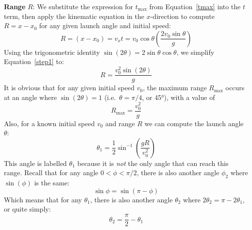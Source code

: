 \documentclass{../../../oss-handout}
\begin{document}
\textbf{Range} $R$: We substitute the expression for $t_\text{max}$ from
Equation~\ref{tmax} into the $t$ term, then apply the kinematic equation in
the $x$-direction to compute $R=x-x_0$ for any given launch angle and initial
speed:
\begin{equation}
  R=(x-x_0)=v_xt=v_0\cos\theta\left(\frac{2v_0\sin\theta}{g}\right)
  \label{step1}
\end{equation}
Using the trigonometric identity $\sin(2\theta)=2\sin\theta\cos\theta$, we
simplify Equation~\ref{step1} to:
\begin{equation}
  \boxed{R=\frac{v_0^2\sin(2\theta)}g}
\end{equation}
It is obvious that for any given initial speed $v_0$, the maximum range
$R_\text{max}$ occurs at an angle where $\sin(2\theta)=1$
(i.e.\ $\theta=\pi/4$, or \ang{45}), with a value of
\begin{equation}
  \boxed{R_\text{max}=\frac{v_0^2}g}
\end{equation}
Also, for a known initial speed $v_0$ and range $R$ we can compute the launch
angle $\theta$:
\begin{displaymath}
  \theta_1=\frac{1}{2}\sin^{-1}\left(\frac{gR}{v_0^2}\right)
\end{displaymath}
This angle is labelled $\theta_1$ because it is \emph{not} the only angle that
can reach this range. Recall that for any angle $0<\phi<\pi/2$, there
is also another angle $\phi_2$ where $\sin(\phi)$ is the same:
\begin{displaymath}
  \sin\phi=\sin(\pi-\phi)
\end{displaymath}
Which means that for any $\theta_1$, there is also another angle
$\theta_2$ where $2\theta_2=\pi-2\theta_1$, or quite simply:
\begin{displaymath}
  \theta_2=\frac{\pi}{2}-\theta_1
\end{displaymath}
\end{document}
